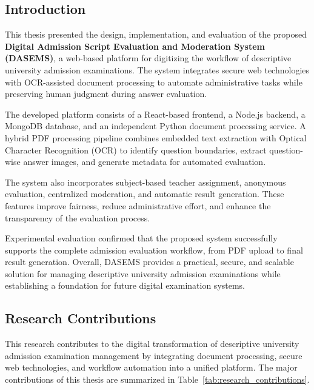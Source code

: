 

\vspace{0.5cm}

\subsection{Introduction}

This thesis presented the design, implementation, and evaluation of the proposed \textbf{Digital Admission Script Evaluation and Moderation System (DASEMS)}, a web-based platform for digitizing the workflow of descriptive university admission examinations. The system integrates secure web technologies with OCR-assisted document processing to automate administrative tasks while preserving human judgment during answer evaluation.

The developed platform consists of a React-based frontend, a Node.js backend, a MongoDB database, and an independent Python document processing service. A hybrid PDF processing pipeline combines embedded text extraction with Optical Character Recognition (OCR) to identify question boundaries, extract question-wise answer images, and generate metadata for automated evaluation.

The system also incorporates subject-based teacher assignment, anonymous evaluation, centralized moderation, and automatic result generation. These features improve fairness, reduce administrative effort, and enhance the transparency of the evaluation process.

Experimental evaluation confirmed that the proposed system successfully supports the complete admission evaluation workflow, from PDF upload to final result generation. Overall, DASEMS provides a practical, secure, and scalable solution for managing descriptive university admission examinations while establishing a foundation for future digital examination systems.


\subsection{Research Contributions}

This research contributes to the digital transformation of descriptive university admission examination management by integrating document processing, secure web technologies, and workflow automation into a unified platform. The major contributions of this thesis are summarized in Table~\ref{tab:research_contributions}.

